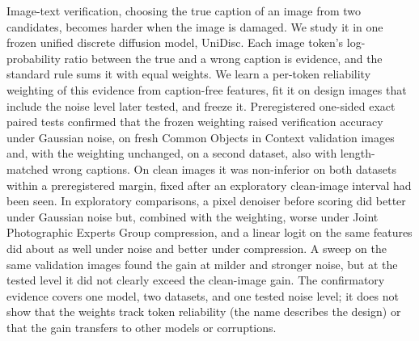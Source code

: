 Image-text verification, choosing the true caption of an image from two candidates, becomes harder when the image is damaged.
We study it in one frozen unified discrete diffusion model, UniDisc.
Each image token's log-probability ratio between the true and a wrong caption is evidence, and the standard rule sums it with equal weights.
We learn a per-token reliability weighting of this evidence from caption-free features, fit it on design images that
include the noise level later tested, and freeze it.
Preregistered one-sided exact paired tests confirmed that the frozen weighting raised verification accuracy under Gaussian noise,
on fresh Common Objects in Context validation images and, with the weighting unchanged, on a second dataset, also with length-matched wrong captions.
On clean images it was non-inferior on both datasets within a preregistered margin, fixed after an exploratory clean-image interval had been seen.
In exploratory comparisons, a pixel denoiser before scoring did better under Gaussian noise but, combined with the weighting, worse under
Joint Photographic Experts Group compression, and a linear logit on the same features did about as well under noise and better under compression.
A sweep on the same validation images found the gain at milder and stronger noise, but at the tested level it did not clearly exceed the clean-image
gain.
The confirmatory evidence covers one model, two datasets, and one tested noise level; it does not show that the weights track token reliability (the
name describes the design) or that the gain transfers to other models or corruptions.
